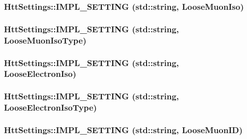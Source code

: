 \label{classHttSettings_a255e2d32a36f214ad7726e7a3644a49e}
\hypertarget{classHttSettings_a4d9b0df2ccdc94ae57c6a9c0a1351066}{
\subsubsection[{IMPL\_\-SETTING}]{\setlength{\rightskip}{0pt plus 5cm}HttSettings::IMPL\_\-SETTING (std::string, \/  LooseMuonIso)}}
\label{classHttSettings_a4d9b0df2ccdc94ae57c6a9c0a1351066}
\hypertarget{classHttSettings_aa8164975f425ab26101a51bf5c347b4d}{
\subsubsection[{IMPL\_\-SETTING}]{\setlength{\rightskip}{0pt plus 5cm}HttSettings::IMPL\_\-SETTING (std::string, \/  LooseMuonIsoType)}}
\label{classHttSettings_aa8164975f425ab26101a51bf5c347b4d}
\hypertarget{classHttSettings_a9ad91ad7904bcad1b441ffe3513483e8}{
\subsubsection[{IMPL\_\-SETTING}]{\setlength{\rightskip}{0pt plus 5cm}HttSettings::IMPL\_\-SETTING (std::string, \/  LooseElectronIso)}}
\label{classHttSettings_a9ad91ad7904bcad1b441ffe3513483e8}
\hypertarget{classHttSettings_ae7c24618e83db51f1e860d14390b15c0}{
\subsubsection[{IMPL\_\-SETTING}]{\setlength{\rightskip}{0pt plus 5cm}HttSettings::IMPL\_\-SETTING (std::string, \/  LooseElectronIsoType)}}
\label{classHttSettings_ae7c24618e83db51f1e860d14390b15c0}
\hypertarget{classHttSettings_aff328a890479ff02d7a8c7b126da3efa}{
\subsubsection[{IMPL\_\-SETTING}]{\setlength{\rightskip}{0pt plus 5cm}HttSettings::IMPL\_\-SETTING (std::string, \/  LooseMuonID)}}
